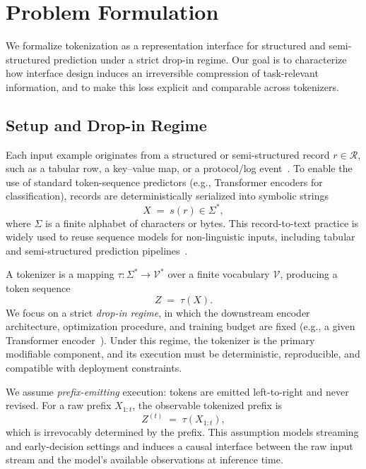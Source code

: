 \section{Problem Formulation}
\label{sec:formulation}

We formalize tokenization as a representation interface for structured and semi-structured prediction under a strict drop-in regime.
Our goal is to characterize how interface design induces an irreversible compression of task-relevant information, and to make this loss explicit and comparable across tokenizers.

\subsection{Setup and Drop-in Regime}
\label{sec:setup}

Each input example originates from a structured or semi-structured record $r \in \mathcal{R}$, such as a tabular row, a key--value map, or a protocol/log event~\cite{he2017drain,du2017deeplog}.
To enable the use of standard token-sequence predictors (e.g., Transformer encoders for classification), records are deterministically serialized into symbolic strings
\begin{equation}
X \;=\; s(r) \in \Sigma^\ast,
\label{eq:serialization}
\end{equation}
where $\Sigma$ is a finite alphabet of characters or bytes.
This record-to-text practice is widely used to reuse sequence models for non-linguistic inputs, including tabular and semi-structured prediction pipelines~\cite{yin2020tabert,herzig2020tapas}.

A tokenizer is a mapping $\tau : \Sigma^\ast \rightarrow \mathcal{V}^\ast$ over a finite vocabulary $\mathcal{V}$, producing a token sequence
\[
Z \;=\; \tau(X).
\]
We focus on a strict \emph{drop-in regime}, in which the downstream encoder architecture, optimization procedure, and training budget are fixed (e.g., a given Transformer encoder~\cite{vaswani2017attention,devlin2019bert}).
Under this regime, the tokenizer is the primary modifiable component, and its execution must be deterministic, reproducible, and compatible with deployment constraints.

We assume \emph{prefix-emitting} execution: tokens are emitted left-to-right and never revised.
For a raw prefix $X_{1:t}$, the observable tokenized prefix is
\begin{equation}
Z^{(t)} \;=\; \tau(X_{1:t}),
\label{eq:prefix_tok}
\end{equation}
which is irrevocably determined by the prefix.
This assumption models streaming and early-decision settings and induces a causal interface between the raw input stream and the model's available observations at inference time.

